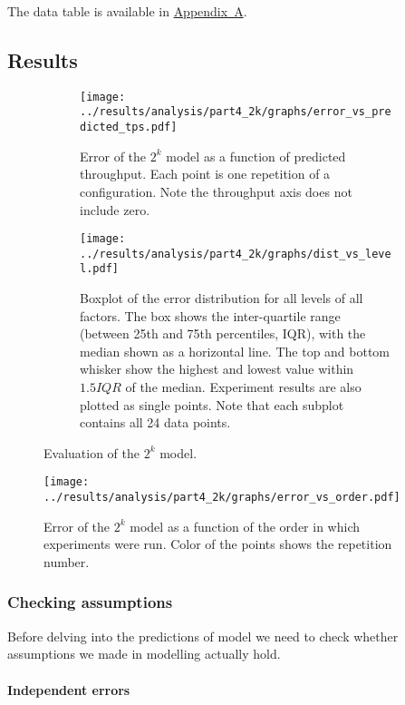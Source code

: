\documentclass[11pt]{article}
\begin{document}
The data table is available in \hyperref[sec:appa]{Appendix~A}.

%

\subsection{Results}

\begin{figure}[h]
\centering
\begin{subfigure}[t]{0.49\textwidth}
\centering
\texttt{[image: ../results/analysis/part4\_2k/graphs/error\_vs\_predicted\_tps.pdf]}
\caption{Error of the $2^k$ model as a function of predicted throughput. Each point is one repetition of a configuration. Note the throughput axis does not include zero.}
\label{fig:part4:errorvspredicted}
\end{subfigure}
\begin{subfigure}[t]{0.49\textwidth}
\centering
\texttt{[image: ../results/analysis/part4\_2k/graphs/dist\_vs\_level.pdf]}
\caption{Boxplot of the error distribution for all levels of all factors. The box shows the inter-quartile range (between 25th and 75th percentiles, IQR), with the median shown as a horizontal line. The top and bottom whisker show the highest and lowest value within $1.5 IQR$ of the median. Experiment results are also plotted as single points. Note that each subplot contains all 24 data points.}
\label{fig:part4:errordistvslevel}
\end{subfigure}
\caption{Evaluation of the $2^k$ model.}
\end{figure}


\begin{figure}[h]
\centering
\texttt{[image: ../results/analysis/part4\_2k/graphs/error\_vs\_order.pdf]}
\caption{Error of the $2^k$ model as a function of the order in which experiments were run. Color of the points shows the repetition number.}
\label{fig:part4:errorvsorder}
\end{figure}


\subsubsection{Checking assumptions}

Before delving into the predictions of model we need to check whether assumptions we made in modelling actually hold.

\paragraph{Independent errors}
\end{document}
